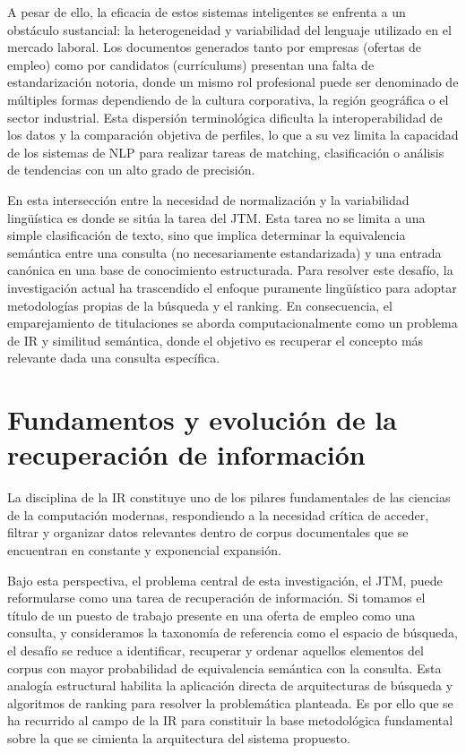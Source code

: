 A pesar de ello, la eficacia de estos sistemas inteligentes se enfrenta a un obstáculo sustancial: la heterogeneidad y variabilidad del lenguaje utilizado en el mercado laboral. Los documentos generados tanto por empresas (ofertas de empleo) como por candidatos (currículums) presentan una falta de estandarización notoria, donde un mismo rol profesional puede ser denominado de múltiples formas dependiendo de la cultura corporativa, la región geográfica o el sector industrial. Esta dispersión terminológica dificulta la interoperabilidad de los datos y la comparación objetiva de perfiles, lo que a su vez limita la capacidad de los sistemas de \gls{NLP} para realizar tareas de matching, clasificación o análisis de tendencias con un alto grado de precisión.%

En esta intersección entre la necesidad de normalización y la variabilidad lingüística es donde se sitúa la tarea del \gls{JTM}. Esta tarea no se limita a una simple clasificación de texto, sino que implica determinar la equivalencia semántica entre una consulta (no necesariamente estandarizada) y una entrada canónica en una base de conocimiento estructurada. Para resolver este desafío, la investigación actual ha trascendido el enfoque puramente lingüístico para adoptar metodologías propias de la búsqueda y el ranking. En consecuencia, el emparejamiento de titulaciones se aborda computacionalmente como un problema de \gls{IR} y similitud semántica, donde el objetivo es recuperar el concepto más relevante dada una consulta específica. 

\section{Fundamentos y evolución de la recuperación de información}
\label{sec:RetrievalHistory}

\noindent La disciplina de la \gls{IR} constituye uno de los pilares fundamentales de las ciencias de la computación modernas, respondiendo a la necesidad crítica de acceder, filtrar y organizar datos relevantes dentro de corpus documentales que se encuentran en constante y exponencial expansión.

Bajo esta perspectiva, el problema central de esta investigación, el \gls{JTM}, puede reformularse como una tarea de recuperación de información. Si tomamos el título de un puesto de trabajo presente en una oferta de empleo como una consulta, y consideramos la taxonomía de referencia como el espacio de búsqueda, el desafío se reduce a identificar, recuperar y ordenar aquellos elementos del corpus con mayor probabilidad de equivalencia semántica con la consulta. Esta analogía estructural habilita la aplicación directa de arquitecturas de búsqueda y algoritmos de ranking para resolver la problemática planteada. Es por ello que se ha recurrido al campo de la \gls{IR} para constituir la base metodológica fundamental sobre la que se cimienta la arquitectura del sistema propuesto.

